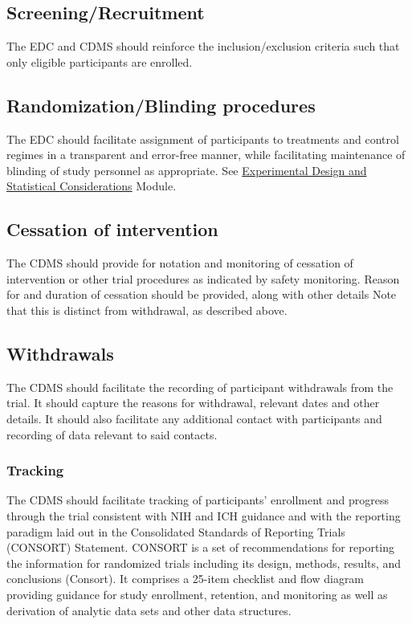 \documentclass[]{book}
\theoremstyle{definition}
\theoremstyle{definition}
\theoremstyle{definition}
\theoremstyle{remark}
\begin{document}
\subsection{Screening/Recruitment}\label{screeningrecruitment}

The EDC and CDMS should reinforce the inclusion/exclusion criteria such
that only eligible participants are enrolled.

\subsection{Randomization/Blinding
procedures}\label{randomizationblinding-procedures}

The EDC should facilitate assignment of participants to treatments and
control regimes in a transparent and error-free manner, while
facilitating maintenance of blinding of study personnel as appropriate.
See
\href{https://ifar-isac.github.io/book/experimental-design-and-statistical-considerations.html}{Experimental
Design and Statistical Considerations} Module.

\subsection{Cessation of intervention}\label{cessation-of-intervention}

The CDMS should provide for notation and monitoring of cessation of
intervention or other trial procedures as indicated by safety
monitoring. Reason for and duration of cessation should be provided,
along with other details Note that this is distinct from withdrawal, as
described above.

\subsection{Withdrawals}\label{withdrawals}

The CDMS should facilitate the recording of participant withdrawals from
the trial. It should capture the reasons for withdrawal, relevant dates
and other details. It should also facilitate any additional contact with
participants and recording of data relevant to said contacts.

\subsubsection{Tracking}\label{tracking}

The CDMS should facilitate tracking of participants' enrollment and
progress through the trial consistent with NIH and ICH guidance and with
the reporting paradigm laid out in the Consolidated Standards of
Reporting Trials (CONSORT) Statement. CONSORT is a set of
recommendations for reporting the information for randomized trials
including its design, methods, results, and conclusions (Consort). It
comprises a 25-item checklist and flow diagram providing guidance for
study enrollment, retention, and monitoring as well as derivation of
analytic data sets and other data structures.
\end{document}
